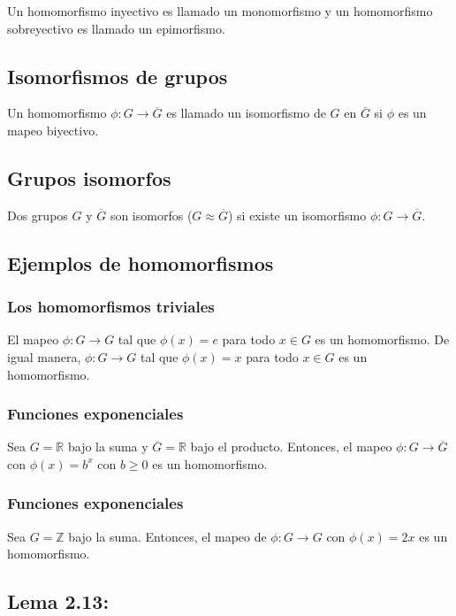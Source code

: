 \documentclass{article}
\begin{document}
Un homomorfismo inyectivo es llamado un monomorfismo y un homomorfismo sobreyectivo es llamado un epimorfismo.

\subsection*{\color{violet} Isomorfismos de grupos}

Un homomorfismo $\phi:G\to\overline{G}$ es llamado un isomorfismo de $G$ en $\overline{G}$ si $\phi$ es un mapeo biyectivo.

\subsection*{\color{violet} Grupos isomorfos}

Dos grupos $G$ y $\overline{G}$ son isomorfos ($G\approx\overline{G}$) si existe un isomorfismo $\phi:G\to\overline{G}$.

\subsection*{\color{teal} Ejemplos de homomorfismos}

\subsubsection*{\color{teal} Los homomorfismos triviales}

El mapeo $\phi:G\to G$ tal que $\phi(x)=e$ para todo $x\in G$ es un homomorfismo. De igual manera, $\phi:G\to G$ tal que $\phi(x)=x$ para todo $x\in G$ es un homomorfismo.

\subsubsection*{\color{teal} Funciones exponenciales}

Sea $G=\mathbb{R}$ bajo la suma y $\overline{G}=\mathbb{R}$ bajo el producto. Entonces, el mapeo $\phi:G\to\overline{G}$ con $\phi(x)=b^x$ con $b\geq 0$ es un homomorfismo.

\subsubsection*{\color{teal} Funciones exponenciales}

Sea $G=\mathbb{Z}$ bajo la suma. Entonces, el mapeo de $\phi:G\to G$ con $\phi(x)=2x$ es un homomorfismo.

\subsection*{\color{blue} Lema 2.13:}
\end{document}
